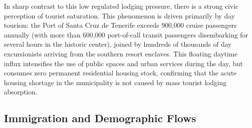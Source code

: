 In sharp contrast to this low regulated lodging pressure, there is a strong civic perception of tourist saturation.
This phenomenon is driven primarily by day tourism:
the Port of Santa Cruz de Tenerife exceeds 900,000 cruise passengers annually (with more than 600,000 port-of-call transit passengers disembarking for several hours in the historic center),
joined by hundreds of thousands of day excursionists arriving from the southern resort enclaves.
This floating daytime influx intensifies the use of public spaces and urban services during the day, but consumes zero permanent residential housing stock,
confirming that the acute housing shortage in the municipality is not caused by mass tourist lodging absorption.

\subsection{Immigration and Demographic Flows}

